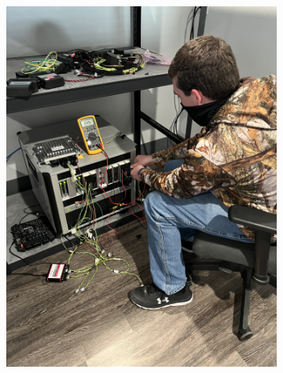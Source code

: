 \documentclass[conference]{IEEEtran}
\begin{document}
\begin{figure}
    \centering
    \begin{subfigure}[b]{0.48\linewidth}
		\centering
    		\includegraphics[angle=270,width=0.9\linewidth]{figs/img/picturesVisitToAStuff/aStuffVisit2Nick}
    		\caption{}
    \end{subfigure}
    \begin{subfigure}[b]{0.48\linewidth}
		\centering

\end{subfigure}
\end{figure}
\end{document}
